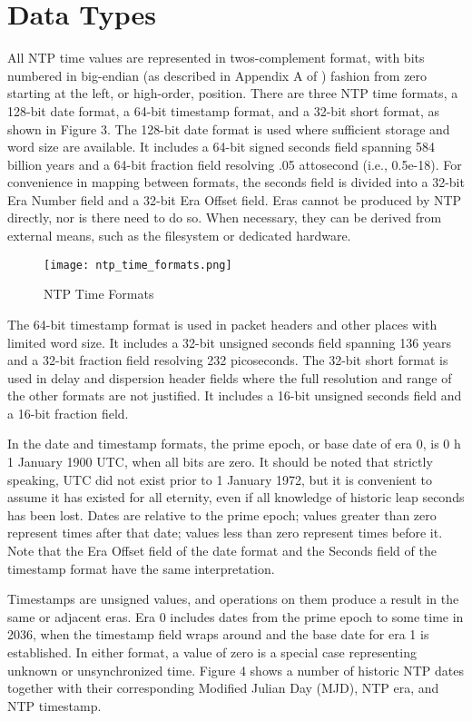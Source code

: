 \chapter{Data Types}

All NTP time values are represented in twos-complement format, with
bits numbered in big-endian (as described in Appendix A of \cite{RFC0791})
fashion from zero starting at the left, or high-order, position.
There are three NTP time formats, a 128-bit date format, a 64-bit
timestamp format, and a 32-bit short format, as shown in Figure 3.
The 128-bit date format is used where sufficient storage and word
size are available. It includes a 64-bit signed seconds field
spanning 584 billion years and a 64-bit fraction field resolving .05
attosecond (i.e., 0.5e-18). For convenience in mapping between
formats, the seconds field is divided into a 32-bit Era Number field
and a 32-bit Era Offset field. Eras cannot be produced by NTP
directly, nor is there need to do so. When necessary, they can be
derived from external means, such as the filesystem or dedicated
hardware.

\begin{figure}
\centering
\texttt{[image: ntp\_time\_formats.png]}
\caption{NTP Time Formats}
\label{ntp_time_formats}
\end{figure}

The 64-bit timestamp format is used in packet headers and other
places with limited word size. It includes a 32-bit unsigned seconds
field spanning 136 years and a 32-bit fraction field resolving 232
picoseconds. The 32-bit short format is used in delay and dispersion
header fields where the full resolution and range of the other
formats are not justified. It includes a 16-bit unsigned seconds
field and a 16-bit fraction field.

In the date and timestamp formats, the prime epoch, or base date of
era 0, is 0 h 1 January 1900 UTC, when all bits are zero. It should
be noted that strictly speaking, UTC did not exist prior to 1 January
1972, but it is convenient to assume it has existed for all eternity,
even if all knowledge of historic leap seconds has been lost. Dates
are relative to the prime epoch; values greater than zero represent
times after that date; values less than zero represent times before
it. Note that the Era Offset field of the date format and the
Seconds field of the timestamp format have the same interpretation.

Timestamps are unsigned values, and operations on them produce a
result in the same or adjacent eras. Era 0 includes dates from the
prime epoch to some time in 2036, when the timestamp field wraps
around and the base date for era 1 is established. In either format,
a value of zero is a special case representing unknown or
unsynchronized time. Figure 4 shows a number of historic NTP dates
together with their corresponding Modified Julian Day (MJD), NTP era,
and NTP timestamp.

